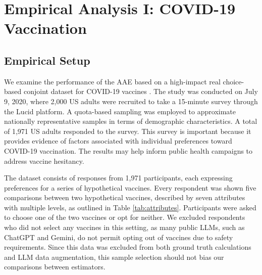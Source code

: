 \section{Empirical Analysis I: COVID-19 Vaccination}
\label{sec:empirical-1}



\subsection{Empirical Setup}
\label{subsec:empirical-setup-1}
We examine the performance of the AAE based on a high-impact real choice-based conjoint dataset for COVID-19 vaccines \citep{kreps2020factors}. The study was conducted on July 9, 2020, where 2,000 US adults were recruited to take a 15-minute survey through the Lucid platform. A quota-based sampling was employed to approximate nationally representative samples in terms of demographic characteristics. A total of 1,971 US adults responded to the survey. This survey is important because it provides evidence of factors associated with individual preferences toward COVID-19 vaccination. The results may help inform public health campaigns to address vaccine hesitancy.

The dataset consists of responses from 1,971 participants, each expressing preferences for a series of hypothetical vaccines. Every respondent was shown five comparisons between two hypothetical vaccines, described by seven attributes with multiple levels, as outlined in Table \ref{tab:attributes}. Participants were asked to choose one of the two vaccines or opt for neither. We excluded respondents who did not select any vaccines in this setting, as many public LLMs, such as ChatGPT and Gemini, do not permit opting out of vaccines due to safety requirements. Since this data was excluded from both ground truth calculations and LLM data augmentation, this sample selection should not bias our comparisons between estimators. 

